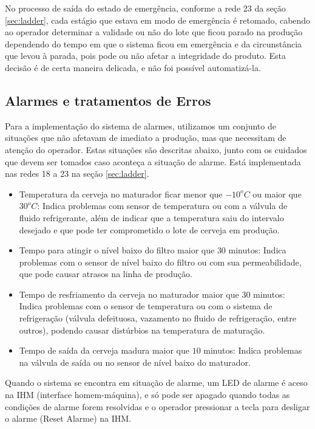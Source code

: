 \documentclass[twoside,twocolumn, 12pt]{paper}
\begin{document}
	No processo de saída do estado de emergência, conforme a rede 23 da seção \ref{sec:ladder}, cada estágio que estava em modo de emergência é retomado, cabendo ao operador determinar a validade ou não do lote que ficou parado na produção dependendo do tempo em que o sistema ficou em emergência e da circunstância que levou à parada, pois pode ou não afetar a integridade do produto. Esta decisão é de certa maneira delicada, e não foi possível automatizá-la. 
	
	\subsection{Alarmes e tratamentos de Erros}
	Para a implementação do sistema de alarmes, utilizamos um conjunto de situações que não afetavam de imediato a produção, mas que necessitam de atenção do operador. Estas situações são descritas abaixo, junto com os cuidados que devem ser tomados caso aconteça a situação de alarme. Está implementada nas redes 18 a 23 na seção \ref{sec:ladder}.
	\begin{itemize}
		\item Temperatura da cerveja no maturador ficar menor que $-10^oC$ ou maior que $30^oC$: Indica problemas com sensor de temperatura ou com a válvula de fluido refrigerante, além de indicar que a temperatura saiu do intervalo desejado e que pode ter comprometido o lote de cerveja em produção.
		\item Tempo para atingir o nível baixo do filtro maior que $30$ minutos: Indica problemas com o sensor de nível baixo do filtro ou com sua permeabilidade, que pode causar atrasos na linha de produção.
		\item Tempo de resfriamento da cerveja no maturador maior que $30$ minutos: Indica problemas com o sensor de temperatura ou com o sistema de refrigeração (válvula defeituosa, vazamento no fluido de refrigeração, entre outros), podendo causar distúrbios na temperatura de maturação.
		\item Tempo de saída da cerveja madura maior que $10$ minutos: Indica problemas na válvula de saída ou no sensor de nível baixo do maturador.
	\end{itemize}
	
	Quando o sistema se encontra em situação de alarme, um LED de alarme é aceso na IHM (interface homem-máquina), e só pode ser apagado quando todas as condições de alarme forem resolvidas e o operador pressionar a tecla para desligar o alarme (Reset Alarme) na IHM.
	
\end{document}
